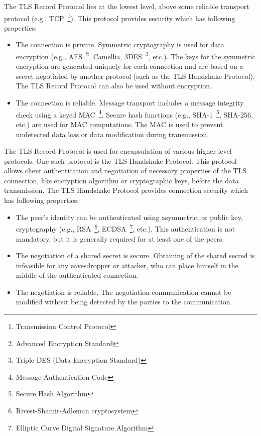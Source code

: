     The TLS Record Protocol lies at the lowest level, above some reliable
    transport protocol (e.g., TCP~\footnote{Transmission Control Protocol}).
    This protocol provides security which has following properties:
    \begin{itemize}
        \item The connection is private. Symmetric cryptography is used
        for data encryption (e.g., AES~\footnote{Advanced Encryption Standard},
        Camellia, 3DES~\footnote{Triple DES (Data Encryption Standard)}, etc.).
        The keys for the symmetric encryption are generated uniquely
        for each connection
        and are based on a secret negotiated by another protocol
        (such as the TLS Handshake Protocol). The TLS Record Protocol can also
        be used without encryption.
        \item The connection is reliable. Message transport includes
        a message integrity check using a keyed
        MAC~\footnote{Message Authentication Code}. Secure hash functions
        (e.g., SHA-1~\footnote{Secure Hash Algorithm}, SHA-256, etc.) are
        used for MAC computations. The MAC is used to prevent undetected
        data loss or data modification during transmission.
    \end{itemize}

    The TLS Record Protocol is used for encapsulation of various higher-level
    protocols. One such protocol is the TLS Handshake Protocol. This protocol
    allows client authentication and negotiation of necessary properties
    of the TLS connection, like encryption algorithm or cryptographic keys,
    before the data transmission. The TLS Handshake Protocol provides
    connection security which has following properties:
    \begin{itemize}
        \item The peer's identity can be authenticated using asymmetric, or
        public key, cryptography (e.g.,
        RSA~\footnote{Rivest-Shamir-Adleman cryptosystem},
        ECDSA~\footnote{Elliptic Curve Digital Signature Algorithm}, etc.).
        This authentication is not mandatory, but it is generally required
        for at least one of the peers.
        \item The negotiation of a shared secret is secure. Obtaining of
        the shared secred is infeasible for any eavesdropper or attacker,
        who can place himself in the middle of the authenticated connection.
        \item The negotiation is reliable. The negotiation communication
        cannot be modified without being detected by the parties to the
        communication.~\cite{rfc5246}
    \end{itemize}

